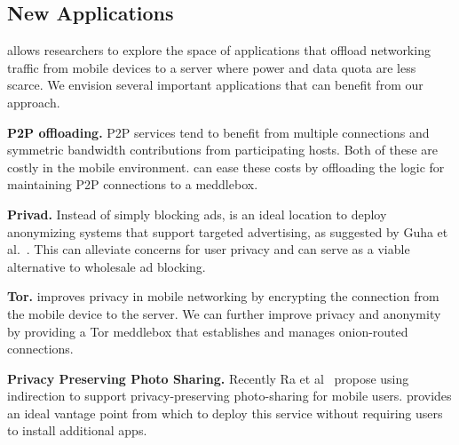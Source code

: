 \subsection{New Applications}
\label{subsec:newapps}

\meddle allows researchers to explore the space of applications that offload 
networking traffic from mobile devices to a server where power and data quota 
are less scarce. We envision several important applications that can benefit 
from our approach.

\begin{packeditemize}
\item \textbf{P2P offloading.} P2P services tend to benefit from multiple connections 
and symmetric bandwidth contributions from participating hosts. Both of these are 
costly in the mobile environment. \meddle can ease these costs by offloading the 
logic for maintaining P2P connections to a meddlebox.
\item \textbf{Privad.}  Instead of simply blocking ads, \meddle is an ideal location 
to deploy anonymizing systems that support targeted advertising, as suggested by 
Guha et al.~\cite{guha:privad}. This can alleviate concerns for user privacy and can 
serve as a viable alternative to wholesale ad blocking.
\item \textbf{Tor.} \meddle improves privacy in mobile networking by encrypting the 
connection from the mobile device to the \meddle server. We can further improve 
privacy and anonymity by providing a Tor meddlebox that establishes and manages 
onion-routed connections.
\item \textbf{Privacy Preserving Photo Sharing.} Recently Ra et al~\cite{ra:p3} propose 
using indirection to support privacy-preserving photo-sharing for mobile users. \meddle 
provides an ideal vantage point from which to deploy this service without requiring 
users to install additional apps. 

\end{packeditemize}


